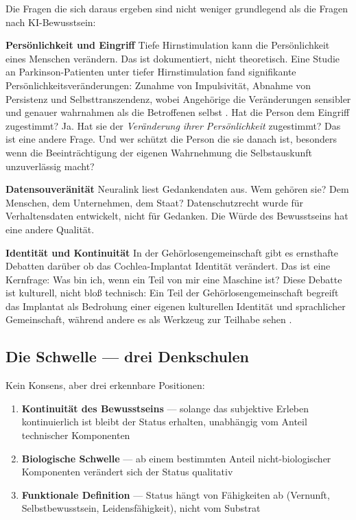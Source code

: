 \documentclass[acmlarge, noacm]{acmart}
\begin{document}
Die Fragen die sich daraus ergeben sind nicht weniger grundlegend als die Fragen nach KI-Bewusstsein:

\textbf{Persönlichkeit und Eingriff}
Tiefe Hirnstimulation kann die Persönlichkeit eines Menschen verändern. Das ist dokumentiert, nicht theoretisch. Eine Studie an Parkinson-Patienten unter tiefer Hirnstimulation fand signifikante Persönlichkeitsveränderungen: Zunahme von Impulsivität, Abnahme von Persistenz und Selbsttranszendenz, wobei Angehörige die Veränderungen sensibler und genauer wahrnahmen als die Betroffenen selbst \cite{pham2015}. Hat die Person dem Eingriff zugestimmt? Ja. Hat sie der \textit{Veränderung ihrer Persönlichkeit} zugestimmt? Das ist eine andere Frage. Und wer schützt die Person die sie danach ist, besonders wenn die Beeinträchtigung der eigenen Wahrnehmung die Selbstauskunft unzuverlässig macht?

\textbf{Datensouveränität}
Neuralink liest Gedankendaten aus. Wem gehören sie? Dem Menschen, dem Unternehmen, dem Staat? Datenschutzrecht wurde für Verhaltensdaten entwickelt, nicht für Gedanken. Die Würde des Bewusstseins hat eine andere Qualität.

\textbf{Identität und Kontinuität}
In der Gehörlosengemeinschaft gibt es ernsthafte Debatten darüber ob das Cochlea-Implantat Identität verändert. Das ist eine Kernfrage: Was bin ich, wenn ein Teil von mir eine Maschine ist? Diese Debatte ist kulturell, nicht bloß technisch: Ein Teil der Gehörlosengemeinschaft begreift das Implantat als Bedrohung einer eigenen kulturellen Identität und sprachlicher Gemeinschaft, während andere es als Werkzeug zur Teilhabe sehen \cite{cherney1999,sparrow2005}.

\subsection{Die Schwelle --- drei Denkschulen}

Kein Konsens, aber drei erkennbare Positionen:

\begin{enumerate}
\item \textbf{Kontinuität des Bewusstseins} --- solange das subjektive Erleben kontinuierlich ist bleibt der Status erhalten, unabhängig vom Anteil technischer Komponenten
\item \textbf{Biologische Schwelle} --- ab einem bestimmten Anteil nicht-biologischer Komponenten verändert sich der Status qualitativ
\item \textbf{Funktionale Definition} --- Status hängt von Fähigkeiten ab (Vernunft, Selbstbewusstsein, Leidensfähigkeit), nicht vom Substrat
\end{enumerate}
\end{document}
